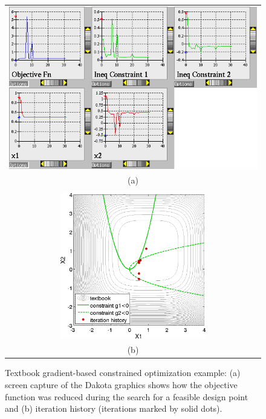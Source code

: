 \begin{figure}[ht!]
  \centering
  \begin{tabular}{c}
  \includegraphics[width=\textwidth]{images/textbook_opt_hist}\\
  (a)\\
  \qquad\\
  \includegraphics[height=2.5in]{images/textbook_history} \\
  (b)
  \end{tabular}
  \caption{Textbook gradient-based constrained optimization example:
    (a) screen capture of the Dakota graphics shows how the objective
    function was reduced during the search for a feasible design point
    and (b) iteration history (iterations marked by solid dots).}
  \label{additional:textbook_grad_constr_graphics}
\end{figure}

